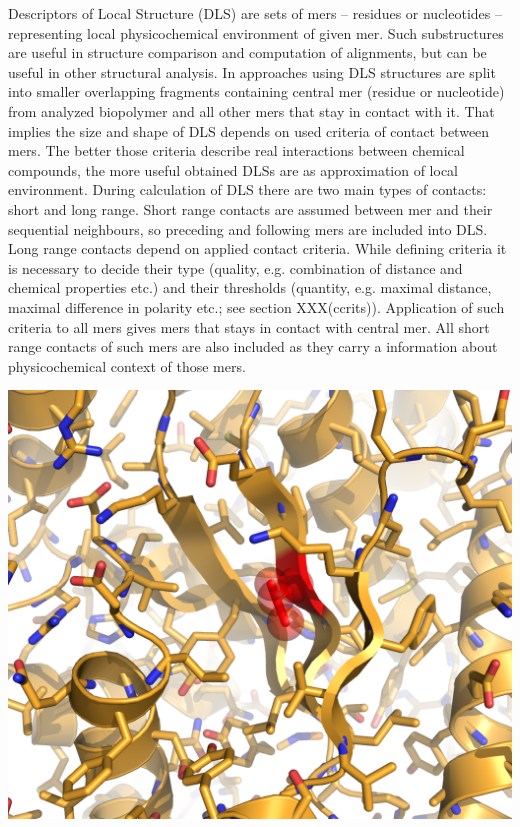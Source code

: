 \documentclass{article}
\begin{document}
    Descriptors of Local Structure (DLS) are sets of mers -- residues or nucleotides -- representing local physicochemical environment of given mer. Such substructures are useful in structure comparison and computation of alignments, but can be useful in other structural analysis.
    In approaches using DLS structures are split into smaller overlapping fragments containing central mer (residue or nucleotide) from analyzed biopolymer and all other mers that stay in contact with it. That implies the size and shape of DLS depends on used criteria of contact between mers. The better those criteria describe real interactions between chemical compounds, the more useful obtained DLSs are as approximation of local environment.
    During calculation of DLS there are two main types of contacts: short and long range. Short range contacts are assumed between mer and their sequential neighbours, so preceding and following mers are included into DLS. Long range contacts depend on applied contact criteria. While defining criteria it is necessary to decide their type (quality, e.g. combination of distance and chemical properties etc.) and their thresholds (quantity, e.g. maximal distance, maximal difference in polarity etc.; see section XXX(ccrits)). Application of such criteria to all mers gives mers that stays in contact with central mer. All short range contacts of such mers are also included as they carry a information about physicochemical context of those mers.

\includegraphics[width=\textwidth]{images/d1.png}
\end{document}
